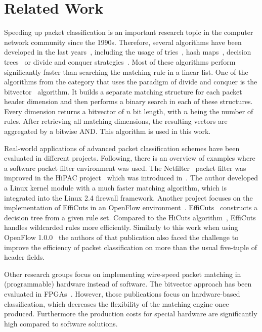 \documentclass[conference]{IEEEtran}
\begin{document}
\section{Related Work}
Speeding up packet classification is an important research topic in the computer network community since the 1990s.
Therefore, several algorithms have been developed in the last 
years~\cite{algorithms_survey}, including the usage of tries~\cite{tries}, 
hash maps~\cite{taylor2005survey}, decision trees~\cite{hicuts, efficuts, hypercuts} or divide 
and conquer strategies~\cite{bv}.
Most of these algorithms perform significantly faster than searching the 
matching rule in a linear list.
One of the algorithms from the category that uses the paradigm of divide 
and conquer is the bitvector~\cite{bv} algorithm.
It builds a separate matching structure for each packet header dimension 
and then performs a binary search in each of these structures.
Every dimension returns a bitvector of $n$ bit length, with $n$ being the 
number of rules.
After retrieving all matching dimensions, the resulting vectors are aggregated by a bitwise AND.
This algorithm is used in this work.

Real-world applications of advanced packet classification schemes have been evaluated in different projects.
Following, there is an overview of examples where a software packet filter environment was used.
The Netfilter~\cite{netfilter} packet filter was improved in the HiPAC project~\cite{hipac} 
which was introduced in~\cite{heinzhigh}.
The author developed a Linux kernel module with a much faster matching algorithm, 
which is integrated into the Linux 2.4 firewall framework.
Another project focuses on the implementation of EffiCuts in an OpenFlow environment~\cite{stimpfling2013optimal}.
EffiCuts~\cite{efficuts} constructs a decision tree from a given rule set.
Compared to the HiCuts algorithm~\cite{hicuts}, EffiCuts handles wildcarded rules more efficiently.
Similarly to this work when using OpenFlow 1.0.0~\cite{openflow_spec10} 
the authors of that publication also faced the challenge to improve the efficiency 
of packet classification on more than the usual five-tuple of header fields.

Other research groups focus on implementing wire-speed packet matching in (programmable) hardware instead of software.
The bitvector approach has been evaluated in FPGAs~\cite{bitvector_fpga, qu2013fast}.
However, those publications focus on hardware-based classification, which decreases 
the flexibility of the matching engine once produced.
Furthermore the production costs for special hardware are significantly high compared to software solutions.
\end{document}
